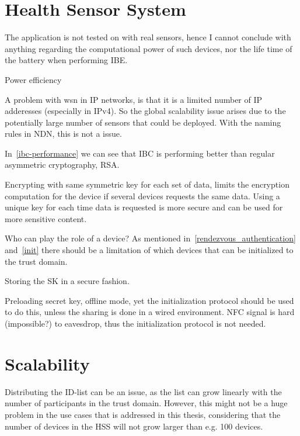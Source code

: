 \section{Health Sensor System}
The application is not tested on with real sensors, hence I cannot conclude with anything regarding the computational power of such devices, nor the life time of the battery when performing \gls{IBE}.  

Power efficiency

A problem with \gls{wsn} in \gls{IP} networks, is that it is a limited number of \gls{IP} adderesses (especially in \gls{IPv4}).
So the global scalability issue arises due to the potentially large number of sensors that could be deployed. 
With the naming rules in \gls{NDN}, this is not a issue.

In~\autoref{ibc-performance} we can see that \gls{IBC} is performing better than regular asymmetric cryptography, RSA. 

Encrypting with same symmetric key for each set of \gls{data}, limits the encryption computation for the device if several devices requests the same \gls{data}.
Using a unique key for each time \gls{data} is requested is more secure and can be used for more sensitive content.

Who can play the role of a device?
As mentioned in~\autoref{rendezvous_authentication} and~\autoref{init} there should be a limitation of which devices that can be initialized to the trust domain.

Storing the \gls{SK} in a secure fashion.

Preloading secret key, offline mode, yet the initialization protocol should be used to do this, unless the sharing is done in a wired environment. 
\gls{NFC} signal is hard (impossible?) to eavesdrop, thus the initialization protocol is not needed. 


\section{Scalability}
Distributing the \gls{ID}-list can be an issue, as the list can grow linearly with the number of participants in the trust domain.
However, this might not be a huge problem in the use cases that is addressed in this thesis, considering that the number of devices in the \gls{HSS} will not grow larger than e.g. 100 devices. 

